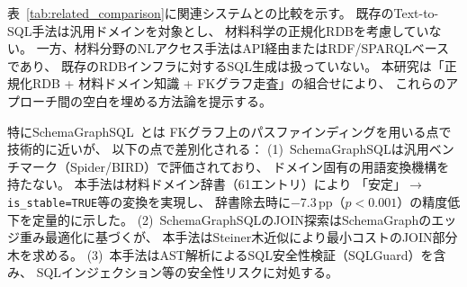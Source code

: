 \documentclass[5p,twocolumn]{elsarticle}
\begin{document}
表~\ref{tab:related_comparison}に関連システムとの比較を示す。
既存のText-to-SQL手法は汎用ドメインを対象とし、
材料科学の正規化RDBを考慮していない。
一方、材料分野のNLアクセス手法はAPI経由またはRDF/SPARQLベースであり、
既存のRDBインフラに対するSQL生成は扱っていない。
本研究は「正規化RDB + 材料ドメイン知識 + FKグラフ走査」の組合せにより、
これらのアプローチ間の空白を埋める方法論を提示する。

特にSchemaGraphSQL~\cite{safdarian2026schemagraphsql}とは
FKグラフ上のパスファインディングを用いる点で技術的に近いが、
以下の点で差別化される：
(1)~SchemaGraphSQLは汎用ベンチマーク（Spider/BIRD）で評価されており、
ドメイン固有の用語変換機構を持たない。
本手法は材料ドメイン辞書（61エントリ）により
「安定」$\to$\texttt{is\_stable=TRUE}等の変換を実現し、
辞書除去時に$-$7.3\,pp（$p<0.001$）の精度低下を定量的に示した。
(2)~SchemaGraphSQLのJOIN探索はSchemaGraphのエッジ重み最適化に基づくが、
本手法はSteiner木近似により最小コストのJOIN部分木を求める。
(3)~本手法はAST解析によるSQL安全性検証（SQLGuard）を含み、
SQLインジェクション等の安全性リスクに対処する。
\end{document}
